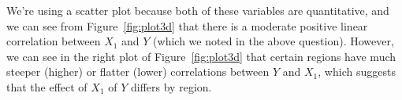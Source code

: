 \documentclass[12pt,letterpaper]{article}
\begin{document}
\noindent We're using a scatter plot because both of these variables are quantitative, and we can see from Figure~\ref{fig:plot3d} that there is a moderate positive linear correlation between $X_1$ and $Y$ (which we noted in the above question). However, we can see in the right plot of Figure~\ref{fig:plot3d} that certain regions have much steeper (higher) or flatter (lower) correlations between $Y$ and $X_1$, which suggests that the effect of $X_1$ of $Y$ differs by region.
\end{document}
